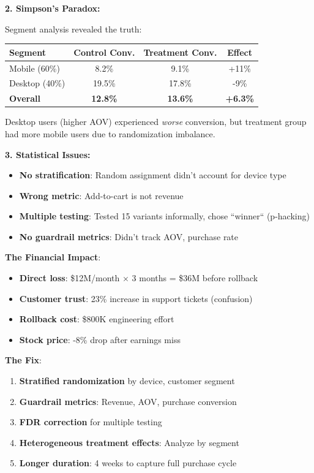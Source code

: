 \textbf{2. Simpson's Paradox:}

Segment analysis revealed the truth:

\begin{center}
\begin{tabular}{lccc}
\hline
\textbf{Segment} & \textbf{Control Conv.} & \textbf{Treatment Conv.} & \textbf{Effect} \\
\hline
Mobile (60\%) & 8.2\% & 9.1\% & +11\% \\
Desktop (40\%) & 19.5\% & 17.8\% & -9\% \\
\textbf{Overall} & \textbf{12.8\%} & \textbf{13.6\%} & \textbf{+6.3\%} \\
\hline
\end{tabular}
\end{center}

Desktop users (higher AOV) experienced \textit{worse} conversion, but treatment group had more mobile users due to randomization imbalance.

\textbf{3. Statistical Issues:}

\begin{itemize}
    \item \textbf{No stratification}: Random assignment didn't account for device type
    \item \textbf{Wrong metric}: Add-to-cart is not revenue
    \item \textbf{Multiple testing}: Tested 15 variants informally, chose ``winner`` (p-hacking)
    \item \textbf{No guardrail metrics}: Didn't track AOV, purchase rate
\end{itemize}

\textbf{The Financial Impact}:
\begin{itemize}
    \item \textbf{Direct loss}: \$12M/month $\times$ 3 months = \$36M before rollback
    \item \textbf{Customer trust}: 23\% increase in support tickets (confusion)
    \item \textbf{Rollback cost}: \$800K engineering effort
    \item \textbf{Stock price}: -8\% drop after earnings miss
\end{itemize}

\textbf{The Fix}:

\begin{enumerate}
    \item \textbf{Stratified randomization} by device, customer segment
    \item \textbf{Guardrail metrics}: Revenue, AOV, purchase conversion
    \item \textbf{FDR correction} for multiple testing
    \item \textbf{Heterogeneous treatment effects}: Analyze by segment
    \item \textbf{Longer duration}: 4 weeks to capture full purchase cycle
\end{enumerate}

